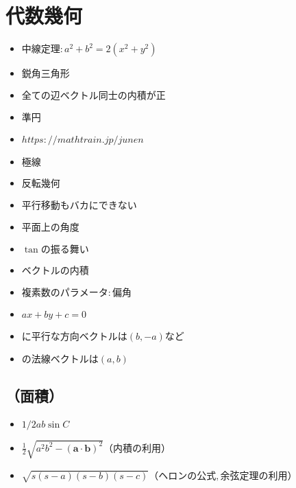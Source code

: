 \documentclass[dvipdfmx,uplatex]{jsarticle}
\begin{document}
\section{代数幾何}
\begin{itemize}
	\item $ 中線定理: a^2+b^2 = 2(x^2+y^2)$
	\item $ 鋭角三角形$
		\item $ 全ての辺ベクトル同士の内積が正$
	\item $ 準円$
		\item $ https://mathtrain.jp/junen$
	\item $ 極線$
	\item $ 反転幾何$
	\item $ 平行移動もバカにできない$
	\item $ 平面上の角度$
		\item $ \tan の振る舞い$
		\item $ ベクトルの内積$
		\item $ 複素数のパラメータ:偏角$
	\item $ ax+by+c=0$
		\item $ に平行な方向ベクトルは(b,-a)など$
		\item $ の法線ベクトルは(a,b)$
\end{itemize}
\subsection{（面積）}
\begin{itemize}
	\item $ 1/2ab \sin C$
		\item $ \frac{1}{2} \sqrt{a^2b^2 - (\bm{a} \cdot \bm{b})^2} （内積の利用）$
		\item $ \sqrt{s(s-a)(s-b)(s-c)} （ヘロンの公式,余弦定理の利用）$
\end{itemize}
\end{document}
